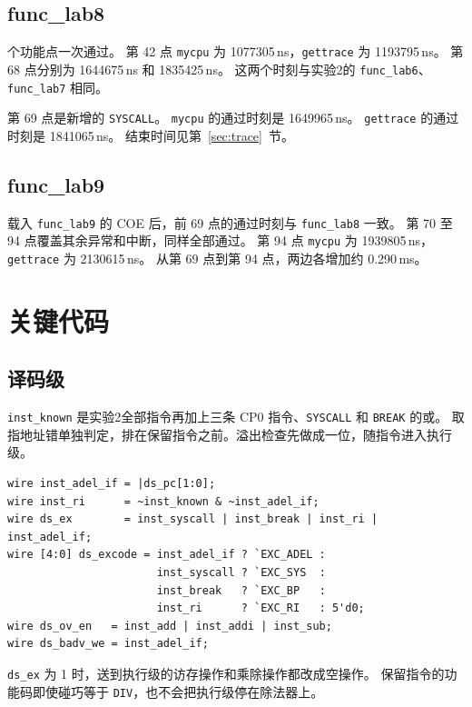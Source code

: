 \documentclass{article}
\begin{document}
\subsection{func\_lab8}
{ 个功能点一次通过。
第 42 点 \texttt{mycpu} 为 1077305\,ns，\texttt{gettrace} 为 1193795\,ns。
第 68 点分别为 1644675\,ns 和 1835425\,ns。
这两个时刻与实验2的 \texttt{func\_lab6}、\texttt{func\_lab7} 相同。
\par}
第 69 点是新增的 \texttt{SYSCALL}。
\texttt{mycpu} 的通过时刻是 1649965\,ns。
\texttt{gettrace} 的通过时刻是 1841065\,ns。
结束时间见第~\ref{sec:trace}~节。

\subsection{func\_lab9}
载入 \texttt{func\_lab9} 的 COE 后，前 69 点的通过时刻与 \texttt{func\_lab8} 一致。
第 70 至 94 点覆盖其余异常和中断，同样全部通过。
第 94 点 \texttt{mycpu} 为 1939805\,ns，\texttt{gettrace} 为 2130615\,ns。
从第 69 点到第 94 点，两边各增加约 0.290\,ms。

\section{关键代码}
\subsection{译码级}
\texttt{inst\_known} 是实验2全部指令再加上三条 CP0 指令、\texttt{SYSCALL} 和 \texttt{BREAK} 的或。
取指地址错单独判定，排在保留指令之前。溢出检查先做成一位，随指令进入执行级。
\begin{verbatim}
wire inst_adel_if = |ds_pc[1:0];
wire inst_ri      = ~inst_known & ~inst_adel_if;
wire ds_ex        = inst_syscall | inst_break | inst_ri | inst_adel_if;
wire [4:0] ds_excode = inst_adel_if ? `EXC_ADEL :
                       inst_syscall ? `EXC_SYS  :
                       inst_break   ? `EXC_BP   :
                       inst_ri      ? `EXC_RI   : 5'd0;
wire ds_ov_en   = inst_add | inst_addi | inst_sub;
wire ds_badv_we = inst_adel_if;
\end{verbatim}
\texttt{ds\_ex} 为 1 时，送到执行级的访存操作和乘除操作都改成空操作。
保留指令的功能码即使碰巧等于 \texttt{DIV}，也不会把执行级停在除法器上。
\end{document}
